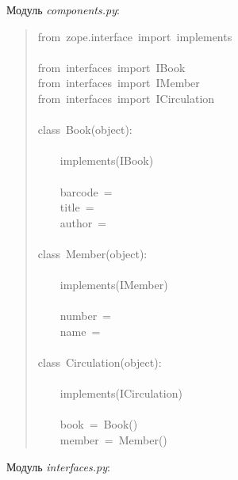 \documentclass[a4paper,openany,twoside,final]{book}
\providecommand*{\DUroletitlereference}[1]{\textsl{#1}}
\begin{document}
Модуль \DUroletitlereference{components.py}:

\begin{quote}{\ttfamily \raggedright \noindent
from~zope.interface~import~implements\\
~\\
from~interfaces~import~IBook\\
from~interfaces~import~IMember\\
from~interfaces~import~ICirculation\\
~\\
class~Book(object):\\
~\\
~~~~implements(IBook)\\
~\\
~~~~barcode~=~\textquotedbl{}\textquotedbl{}\\
~~~~title~=~\textquotedbl{}\textquotedbl{}\\
~~~~author~=~\textquotedbl{}\textquotedbl{}\\
~\\
class~Member(object):\\
~\\
~~~~implements(IMember)\\
~\\
~~~~number~=~\textquotedbl{}\textquotedbl{}\\
~~~~name~=~\textquotedbl{}\textquotedbl{}\\
~\\
class~Circulation(object):\\
~\\
~~~~implements(ICirculation)\\
~\\
~~~~book~=~Book()\\
~~~~member~=~Member()
}
\end{quote}

Модуль \DUroletitlereference{interfaces.py}:
\end{document}

